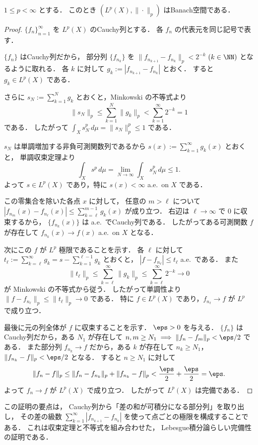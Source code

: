 \begin{theorem}
$1\le p<\infty$ とする．
このとき $(L^p(X),\|\cdot\|_p)$ はBanach空間である．
\end{theorem}
\begin{proof}
$\{f_n\}_{n=1}^{\infty}$ を $L^p(X)$ のCauchy列とする．
各 $f_n$ の代表元を同じ記号で表す．

$\{f_n\}$ はCauchy列だから，
部分列 $\{f_{n_k}\}$ を
$\|f_{n_{k+1}}-f_{n_k}\|_p<2^{-k}$ $(k\in\NN)$ となるように取れる．
各 $k$ に対して
$g_k:=|f_{n_{k+1}}-f_{n_k}|$ とおく．
すると $g_k\in L^p(X)$ である．

さらに
$s_N:=\sum_{k=1}^N g_k$ とおくと，Minkowski の不等式より
\[
\|s_N\|_p
\le
\sum_{k=1}^N \|g_k\|_p
<
\sum_{k=1}^{\infty}2^{-k}
=1
\]
である．
したがって
$\int_X s_N^p\,d\mu=\|s_N\|_p^p\le 1$ である．

$s_N$ は単調増加する非負可測関数列であるから
$s(x):=\sum_{k=1}^{\infty}g_k(x)$ とおくと，
単調収束定理より
\[
\int_X s^p\,d\mu
=
\lim_{N\to\infty}\int_X s_N^p\,d\mu
\le 1.
\]
よって
$s\in L^p(X)$ であり，特に $s(x)<\infty$ a.e.\ on $X$ である．

この零集合を除いた各点 $x$ に対して，
任意の $m>\ell$ について
$|f_{n_m}(x)-f_{n_\ell}(x)|\le \sum_{k=\ell}^{m-1}g_k(x)$ が成り立つ．
右辺は $\ell\to\infty$ で $0$ に収束するから，
$\{f_{n_k}(x)\}$ は a.e.\ でCauchy列である．
したがってある可測関数 $f$ が存在して
$f_{n_k}(x)\to f(x)$ a.e.\ on $X$ となる．

次にこの $f$ が $L^p$ 極限であることを示す．
各 $\ell$ に対して
$t_\ell:=\sum_{k=\ell}^{\infty}g_k=s-\sum_{k=1}^{\ell-1}g_k$ とおくと，
$|f-f_{n_\ell}|\le t_\ell$ a.e.\ である．
また
\[
\|t_\ell\|_p
\le
\sum_{k=\ell}^{\infty}\|g_k\|_p
\le
\sum_{k=\ell}^{\infty}2^{-k}
\to 0
\]
が Minkowski の不等式から従う．
したがって単調性より
$\|f-f_{n_\ell}\|_p\le \|t_\ell\|_p\to 0$ である．
特に $f\in L^p(X)$ であり，$f_{n_\ell}\to f$ が $L^p$ で成り立つ．

最後に元の列全体が $f$ に収束することを示す．
$\eps>0$ を与える．
$\{f_n\}$ はCauchy列だから，ある $N_1$ が存在して
$n,m\ge N_1 \implies \|f_n-f_m\|_p<\eps/2$ である．
また部分列 $f_{n_k}\to f$ だから，ある $k$ が存在して
$n_k\ge N_1$，$\|f_{n_k}-f\|_p<\eps/2$ となる．
すると $n\ge N_1$ に対して
\[
\|f_n-f\|_p
\le
\|f_n-f_{n_k}\|_p+\|f_{n_k}-f\|_p
<
\frac{\eps}{2}+\frac{\eps}{2}
=\eps.
\]
よって
$f_n\to f$ が $L^p(X)$ で成り立つ．
したがって $L^p(X)$ は完備である．
\end{proof}

\begin{remark}
この証明の要点は，
Cauchy列から「差の和が可積分になる部分列」を取り出し，
その差の級数 $\sum_{k=1}^{\infty}|f_{n_{k+1}}-f_{n_k}|$ を使って点ごとの極限を構成することである．
これは収束定理と不等式を組み合わせた，
Lebesgue積分論らしい完備性の証明である．
\end{remark}

